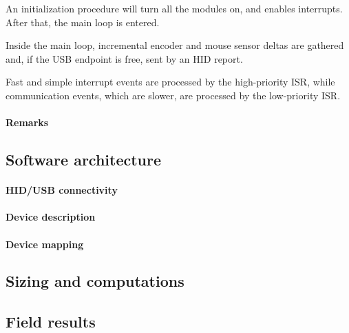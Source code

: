 \documentclass[a4paper,10pt]{article}
\begin{document}
\begin{multicols}{2}
An initialization procedure will turn all the modules on, and enables
interrupts. After that, the main loop is entered.

Inside the main loop, incremental encoder and mouse sensor deltas are gathered
and, if the USB endpoint is free, sent by an HID report.

Fast and simple interrupt events are processed by the high-priority ISR, while
communication events, which are slower, are processed by the low-priority ISR.


\paragraph{Remarks}
\TODO


\subsection{Software architecture}

\TODO


\paragraph{HID/USB connectivity}
\TODO


\paragraph{Device description}
\TODO


\paragraph{Device mapping}
\TODO


\subsection{Sizing and computations}

\TODO


\subsection{Field results}

\TODO



\end{multicols}
\end{document}
